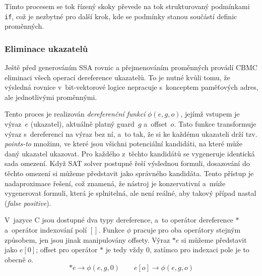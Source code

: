 \documentclass[a4paper, 11pt]{article}
\begin{document}
Tímto procesem se tok řízený skoky převede na tok strukturovaný podmínkami \texttt{if}, což je nezbytné pro další krok, kde se podmínky stanou součástí definic proměnných. \cite{clarke2003hardware}

\subsubsection{Eliminace ukazatelů}
Ještě před generováním SSA rovnic a přejmenováním proměnných provádí CBMC eliminaci všech operací dereference ukazatelů.
To je nutné kvůli tomu, že výsledná rovnice v~bit-vektorové logice nepracuje s~konceptem paměťových adres, ale jednotlivými proměnnými.

Tento proces je realizován \emph{dereferenční funkcí} $\phi(e, g, o)$, jejímž vstupem je výraz~$e$ (ukazatel), aktuálně platný guard~$g$ a~offset~$o$.
Tato funkce transformuje výraz s~dereferencí na výraz bez ní, a~to tak, že si ke každému ukazateli drží tzv. \emph{points-to} množinu, ve které jsou všichni potenciální kandidáti, na které může daný ukazatel ukazovat.
Pro každého z~těchto kandidátů se vygeneruje identická sada omezení.
Když SAT solver postupně řeší výslednou formuli, dosazování do těchto omezení si můžeme představit jako  správného kandidáta.
Tento přístup je nadaproximace řešení, což znamená, že nástroj je konzervativní a~může vygenerovat formuli, která je splnitelná, ale není reálné, aby takový případ nastal (\emph{false positive}).

V~jazyce C jsou dostupné dva typy dereference, a~to operátor dereference $*$ a~operátor indexování polí $[]$.
Funkce $\phi$ pracuje pro oba operátory stejným způsobem, jen jsou jinak manipulovány offsety.
Výraz $*e$ si můžeme představit jako $e[0]$; offset pro operátor $*$ je tedy vždy 0, zatímco pro indexaci pole je to obecně $o$.
\[
    *e \longrightarrow \phi(e, g, 0) \qquad e[o] \longrightarrow \phi(e, g, o)
\]
\end{document}
